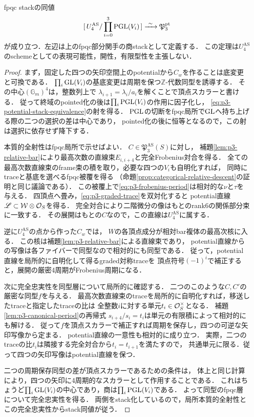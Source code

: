 \begin{theorem}[相対potential表示とpointedモジュライ]
\label{thm:p3-potential-stack}
fpqc stackの同値
\begin{equation}\label{eq:p3-potential-stack-equivalence}
 [\,U_4^{\mathrm{AS}}/\prod_{i=0}^3\mathrm{PGL}(V_i)\,]
 \xrightarrow{\ \sim\ }\mathfrak P_3^{\mathrm{pt}}
\end{equation}
が成り立つ．左辺は上のfpqc部分関手の商stackとして定義する．
この定理は$U_4^{\mathrm{AS}}$のschemeとしての表現可能性，開性，有限型性を主張しない．
\end{theorem}
\begin{proof}
まず，固定した四つの矢印空間上のpotentialから$C_w$を作ることは底変更と可換である．
$\prod_i\mathrm{GL}(V_i)$の基底変更は周期を保つ$\mathbb Z$-代数同型を誘導する．
その中心$(\mathbb G_m)^4$は，整数列上で
$\lambda_{i+1}=\lambda_i/a_i$を解くことで頂点スカラーと書ける．
従って終域のpointed化の後は$\prod_i\mathrm{PGL}(V_i)$の作用に因子化し，
\eqref{eq:p3-potential-stack-equivalence}の射を得る．
$\mathrm{PGL}$の切断をfpqc局所で$\mathrm{GL}$へ持ち上げる際の二つの選択の差は中心であり，
pointed化の後に恒等となるので，この射は選択に依存せず降下する．

本質的全射性はfpqc局所で示せばよい．
$C\in\mathfrak P_3^{\mathrm{AS}}(S)$に対し，
補題\ref{lem:p3-relative-bar}により最高次数の直線束$E_{i,i+4}$と完全Frobenius対合を得る．
全ての最高次数直線束のframe束の積を取り，必要な四つの$V_i$も自明化すれば，
同時にtraceと基底を選べるfpqc被覆を得る
（命題\ref{prop:categorical-relative-descent}の証明と同じ議論である）．
この被覆上で\eqref{eq:p3-frobenius-period}は相対的な$\nu$と$\tau$を与える．
四頂点へ畳み，\eqref{eq:p3-graded-trace}を双対化すると
potential直線$\mathscr L\subset\mathcal W\otimes\mathcal O_S$を得る．
完全対合により二階微分の像はもとのrank6の関係部分束に一致する．
その展開はもとの$C$なので，この直線は$U_4^{\mathrm{AS}}$に属する．

逆に$U_4^{\mathrm{AS}}$の点から作った$C_w$では，
$W$の各頂点成分が相対bar複体の最高次核に入る．
この核は補題\ref{lem:p3-relative-bar}による直線束であり，
potential直線からの写像は各ファイバーで同型なので相対的にも同型である．
従って，potential直線を局所的に自明化して得るgraded対称traceを
頂点符号$(-1)^i$で補正すると，展開の厳密4周期がFrobenius周期になる．

次に完全忠実性を同型層について局所的に確認する．
二つのこのような$C,C'$の厳密な同型$f$を与える．
最高次数直線束のtraceを局所的に自明化すれば，移送したtraceと指定したtraceの比は
全整数$i$に対する単元$t_i\in\mathcal O_S^\times$となる．
補題\ref{lem:p3-canonical-period}の再帰式
$s_{i+4}/s_i=t_i$は単元の有限積によって相対的にも解ける．
従って$f$を頂点スカラーで補正すれば周期を保存し，四つの可逆な矢印写像から定まる．
potential直線の一意性も相対的に成り立つ．
実際，二つのtraceの比$t_i$は隣接する完全対合から$t_i=t_{i+1}$を満たすので，
共通単元に限る．従って四つの矢印写像はpotential直線を保つ．

二つの周期保存同型の差が頂点スカラーであるための条件は，
体上と同じ計算により，四つの矢印に4周期的なスカラーとして作用することである．
これはちょうど$\prod_i\mathrm{GL}(V_i)$の中心であり，商は$\prod_i\mathrm{PGL}(V_i)$である．
よって同型のfpqc層について完全忠実性を得る．
両側をstack化しているので，局所本質的全射性とこの完全忠実性からstack同値が従う．
\end{proof}

